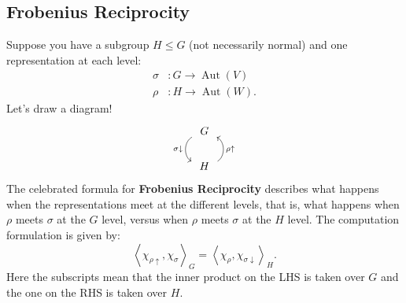 \documentclass[12pt]{article}
\newcommand{\vbrack}[1]{\left \langle #1 \right \rangle}
\theoremstyle{definition}
\DeclareMathOperator\Aut{Aut}
\begin{document}
\subsection{Frobenius Reciprocity}
Suppose you have a subgroup $H \leq G$ (not necessarily normal) and one representation at each level:
\begin{equation}
    \begin{split}
        \sigma & : G \to \Aut(V) \\
        \rho & : H \to \Aut(W).
    \end{split}
\end{equation}
Let's draw a diagram!
\begin{equation}
    \begin{tikzcd}
        G \arrow[d,xshift=-0.7ex,bend right=60,"\sigma \downarrow"'] \\
        H \arrow[u,xshift=0.7ex,bend right=60,"\rho \uparrow"']
    \end{tikzcd}
\end{equation}
The celebrated formula for \textbf{Frobenius Reciprocity} describes what happens when the representations meet at the different levels, that is, what happens when $\rho$ meets $\sigma$ at the $G$ level, versus when $\rho$ meets $\sigma$ at the $H$ level. The computation formulation is given by:
\begin{equation}
    \boxed{ \vbrack{ \chi_{\rho \uparrow} , \chi_{\sigma} }_G = \vbrack{ \chi_{\rho} , \chi_{\sigma \downarrow}}_H. }
\end{equation}
Here the subscripts mean that the inner product on the LHS is taken over $G$ and the one on the RHS is taken over $H$.
\end{document}
